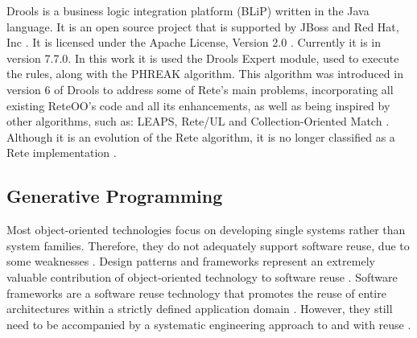 Drools is a business logic integration platform (BLiP) written in the Java language. It is an open source project that is supported by JBoss and Red Hat, Inc \cite{bali2009}. It is licensed under the Apache License, Version 2.0 \cite{browne2009}. Currently it is in version 7.7.0. In this work it is used the Drools Expert module, used to execute the rules, along with the PHREAK algorithm. This algorithm was introduced in version 6 of Drools to address some of Rete's main problems, incorporating all existing ReteOO's code and all its enhancements, as well as being inspired by other algorithms, such as: LEAPS, Rete/UL \cite{doorenbos1995} and Collection-Oriented Match \cite{acharya1993}. Although it is an evolution of the Rete algorithm, it is no longer classified as a Rete implementation \cite{drools2017}.

\subsection{Generative Programming}


Most object-oriented technologies focus on developing single systems rather than system families. Therefore, they do not adequately support software reuse, due to some weaknesses \cite{czarnecki1999}. Design patterns and frameworks represent an extremely valuable contribution of object-oriented technology to software reuse \cite{gamma1994}. Software frameworks are a software reuse technology that promotes the reuse of entire architectures within a strictly defined application domain \cite{cechticky2003}. However, they still need to be accompanied by a systematic engineering approach to and with reuse \cite{czarnecki1999}.


